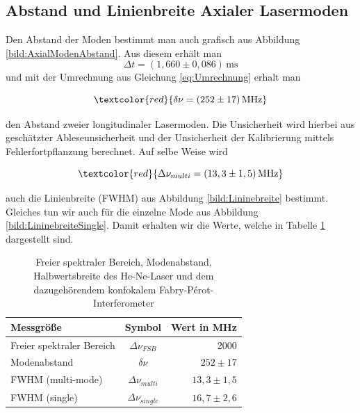 \subsection*{Abstand und Linienbreite Axialer Lasermoden}

Den Abstand der Moden bestimmt man auch grafisch aus Abbildung \ref{bild:AxialModenAbstand}. Aus diesem erhält man 
\begin{equation*}
    \Delta t = (1,660 \pm 0,086)\,\mathrm{ms}
\end{equation*}
und mit der Umrechnung aus Gleichung \ref{eq:Umrechnung} erhalt man 

\begin{equation}
    \textcolor{red}{\delta \nu = (252 \pm 17)\,\mathrm{MHz}}
    \label{eq:Modenabstand}
\end{equation}

den Abstand zweier longitudinaler Lasermoden. Die Unsicherheit wird hierbei aus geschätzter Ableseunsicherheit und
der Unsicherheit der Kalibrierung mittels Fehlerfortpflanzung berechnet. Auf selbe Weise wird 

\begin{equation}
    \textcolor{red}{\Delta \nu_{multi} = (13,3 \pm 1,5)\,\mathrm{MHz}}
\end{equation}

auch die Linienbreite (FWHM) aus Abbildung \ref{bild:Lininebreite} bestimmt. Gleiches tun wir auch für die einzelne Mode
aus Abbildung \ref{bild:LininebreiteSingle}. Damit erhalten wir die Werte, welche in Tabelle \ref{tab:Linienbreite} dargestellt sind.

\begin{table}
    \centering
 
    \begin{tabular}{lcr}
        \toprule
        Messgröße & Symbol & Wert in MHz\\
        \midrule
        Freier spektraler Bereich& $\Delta \nu_{FSB}$ & 2000\\
        Modenabstand& $\delta\nu$& $252 \pm 17$\\
        FWHM (multi-mode)& $\Delta\nu_{multi}$&$13,3 \pm 1,5$\\
        FWHM (single)& $\Delta\nu_{single}$&$16,7 \pm 2,6$\\
        \bottomrule        
    \end{tabular}
  
    \caption{Freier spektraler Bereich, Modenabstand, Halbwertsbreite des He-Ne-Laser und dem dazugehörendem 
    konfokalem Fabry-Pérot-Interferometer}
    \label{tab:Linienbreite}
\end{table}


